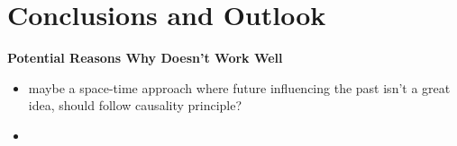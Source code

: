 \documentclass[../draft_1.tex]{subfiles}
\begin{document}
\chapter{Conclusions and Outlook}

\textbf{Potential Reasons Why Doesn't Work Well}

\begin{itemize}
	\item maybe a space-time approach where future influencing the past isn't a great idea, should follow causality principle? 
	\item 
\end{itemize}
\end{document}
